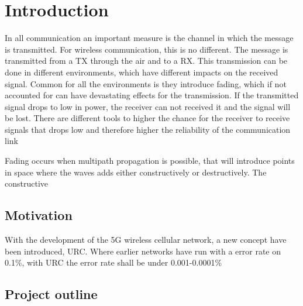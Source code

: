 \chapter{Introduction}

%

In all communication an important measure is the channel in which the message is transmitted. For wireless communication, this is no different. The message is transmitted from a \gls{TX} through the air and to a \gls{RX}. This transmission can be done in different environments, which have different impacts on the received signal. Common for all the environments is they introduce fading, which if not accounted for can have devastating effects for the transmission. If the transmitted signal drops to low in power, the receiver can not received it and the signal will be lost. There are different tools to higher the chance for the receiver to receive signals that drops low and therefore higher the reliability of the communication link

Fading occurs when multipath propagation is possible, that will introduce points in space where the waves adds either constructively or destructively. The constructive 



\section{Motivation}
With the development of the 5G wireless cellular network, a new concept have been introduced, \gls{URC}. Where earlier networks have run with a error rate on 0.1\%, with URC the error rate shall be under 0.001-0.0001\%





\section{Project outline}





